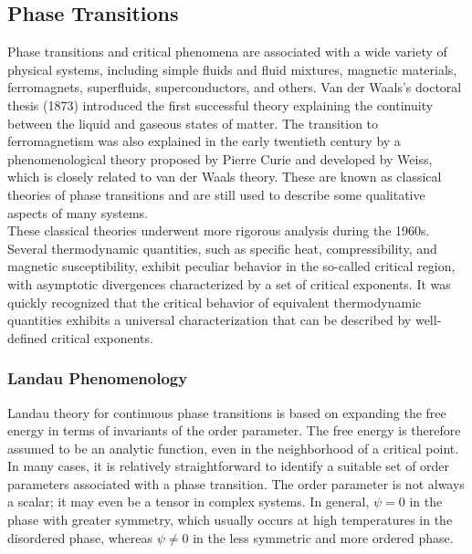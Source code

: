 \documentclass[a4paper]{article}
\begin{document}
\subsection{Phase Transitions}
Phase transitions and critical phenomena are associated with a wide variety of physical systems, including simple fluids and fluid mixtures, magnetic materials, ferromagnets, superfluids, superconductors, and others. Van der Waals's doctoral thesis (1873) introduced the first successful theory explaining the continuity between the liquid and gaseous states of matter. The transition to ferromagnetism was also explained in the early twentieth century by a phenomenological theory proposed by Pierre Curie and developed by Weiss, which is closely related to van der Waals theory. These are known as classical theories of phase transitions and are still used to describe some qualitative aspects of many systems.\\

These classical theories underwent more rigorous analysis during the 1960s. Several thermodynamic quantities, such as specific heat, compressibility, and magnetic susceptibility, exhibit peculiar behavior in the so-called critical region, with asymptotic divergences characterized by a set of critical exponents. It was quickly recognized that the critical behavior of equivalent thermodynamic quantities exhibits a universal characterization that can be described by well-defined critical exponents.\\

\subsubsection{Landau Phenomenology}
Landau theory for continuous phase transitions is based on expanding the free energy in terms of invariants of the order parameter. The free energy is therefore assumed to be an analytic function, even in the neighborhood of a critical point. In many cases, it is relatively straightforward to identify a suitable set of order parameters associated with a phase transition. The order parameter is not always a scalar; it may even be a tensor in complex systems. In general, $\psi=0$ in the phase with greater symmetry, which usually occurs at high temperatures in the disordered phase, whereas $\psi\neq 0$ in the less symmetric and more ordered phase.\\
\end{document}
